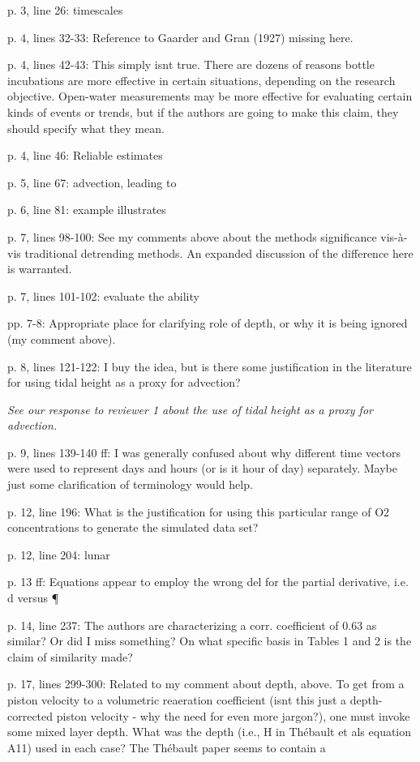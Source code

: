 \documentclass[letterpaper,12pt]{article}\usepackage[]{graphicx}\usepackage[]{color}
\begin{document}
p. 3, line 26: timescales

p. 4, lines 32-33: Reference to Gaarder and Gran (1927) missing here.

p. 4, lines 42-43: This simply isnt true. There are dozens of reasons bottle incubations are more effective in certain situations, depending on the research objective. Open-water measurements may be more effective for evaluating certain kinds of events or trends, but if the authors are going to make this claim, they should specify what they mean.

p. 4, line 46: Reliable estimates

p. 5, line 67: advection, leading to

p. 6, line 81: example illustrates

p. 7, lines 98-100: See my comments above about the methods significance vis-à-vis traditional detrending methods. An expanded discussion of the difference here is warranted.

p. 7, lines 101-102: evaluate the ability

pp. 7-8: Appropriate place for clarifying role of depth, or why it is being ignored (my comment above).

p. 8, lines 121-122: I buy the idea, but is there some justification in the literature for using tidal height as a proxy for advection?

{\it See our response to reviewer 1 about the use of tidal height as a proxy for advection.}

p. 9, lines 139-140 ff: I was generally confused about why different time vectors were used to represent days and hours (or is it hour of day) separately. Maybe just some clarification of terminology would help.

p. 12, line 196: What is the justification for using this particular range of O2 concentrations to generate the simulated data set?

p. 12, line 204: lunar

p. 13 ff: Equations appear to employ the wrong del for the partial derivative, i.e. d versus ¶

p. 14, line 237: The authors are characterizing a corr. coefficient of 0.63 as similar? Or did I
miss something? On what specific basis in Tables 1 and 2 is the claim of similarity made?

p. 17, lines 299-300: Related to my comment about depth, above. To get from a piston velocity
to a volumetric reaeration coefficient (isnt this just a depth-corrected piston velocity - why the need for even more jargon?), one must invoke some mixed layer depth. What was the depth (i.e., H in Thébault et als equation A11) used in each case? The Thébault paper seems to contain a
 
\end{document}

